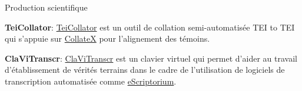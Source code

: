 \begin{rubric}{Production scientifique}
                    
                    \entry*
                \textbf{TeiCollator}: \href{https://github.com/matgille/tei-collator}{TeiCollator}
                        est un outil de collation semi-automatisée TEI to TEI qui s'appuie sur \href{https://pypi.org/project/collatex/}{CollateX} pour l'alignement
                        des témoins.
                    
                    \entry*
                \textbf{ClaViTranscr}: \href{https://github.com/matgille/transcription_virtual_keyboard}{ClaViTranscr} est un clavier virtuel qui permet d'aider au travail
                        d'établissement de vérités terrains dans le cadre de l'utilisation de logiciels
                        de transcription automatisée comme \href{https://gitlab.inria.fr/scripta/escriptorium}{eScriptorium}.
\end{rubric}


